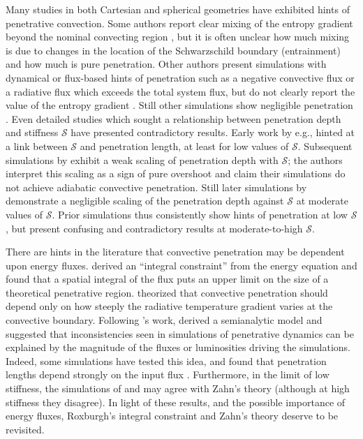 \documentclass[twocolumn]{aastex631}
\newcommand{\mS}{\ensuremath{\mathcal{S}}}
\begin{document}
Many studies in both Cartesian and spherical geometries have exhibited hints of penetrative convection.
Some authors report clear mixing of the entropy gradient beyond the nominal convecting region \citep{hurlburt_etal_1994, saikia_etal_2000, brummell_etal_2002, rogers_glatzmaier_2005, rogers_etal_2006, kitiashvili_etal_2016}, but it is often unclear how much mixing is due to changes in the location of the Schwarzschild boundary (entrainment) and how much is pure penetration.
Other authors present simulations with dynamical or flux-based hints of penetration such as a negative convective flux or a radiative flux which exceeds the total system flux, but do not clearly report the value of the entropy gradient \citep{hurlburt_etal_1986, singh_etal_1995, browning_etal_2004, brun_etal_2017, pratt_etal_2017}.
Still other simulations show negligible penetration \citep[e.g.,][]{higl_etal_2021}.
Even detailed studies which sought a relationship between penetration depth and stiffness $\mS$ have presented contradictory results.
Early work by e.g., \citet{hurlburt_etal_1994, singh_etal_1995} hinted at a link between $\mS$ and penetration length, at least for low values of $\mS$.
Subsequent simulations by \citet{brummell_etal_2002} exhibit a weak scaling of penetration depth with $\mS$; the authors interpret this scaling as a sign of pure overshoot and claim their simulations do not achieve adiabatic convective penetration.
Still later simulations by \citet{rogers_glatzmaier_2005} demonstrate a negligible scaling of the penetration depth against $\mS$ at moderate values of $\mS$.
Prior simulations thus consistently show hints of penetration at low $\mS$ \citep[where results may not be relevant for stars,][]{couston_etal_2017}, but present confusing and contradictory results at moderate-to-high $\mS$.

There are hints in the literature that convective penetration may be dependent upon energy fluxes.
\citet{roxburgh1978, roxburgh1989, roxburgh1992, roxburgh1998} derived an ``integral constraint'' from the energy equation and found that a spatial integral of the flux puts an upper limit on the size of a theoretical penetrative region.
\citet{zahn1991} theorized that convective penetration should depend only on how steeply the radiative temperature gradient varies at the convective boundary.
Following \citet{zahn1991}'s work, \citet{rempel2004} derived a semianalytic model and suggested that inconsistencies seen in simulations of penetrative dynamics can be explained by the magnitude of the fluxes or luminosities driving the simulations.
Indeed, some simulations have tested this idea, and found that penetration lengths depend strongly on the input flux \citep{singh_etal_1998, kapyla_etal_2007, tian_etal_2009, hotta2017, kapyla2019}.
Furthermore, in the limit of low stiffness, the simulations of \citet{hurlburt_etal_1994} and \citet{rogers_glatzmaier_2005} may agree with Zahn's theory (although at high stiffness they disagree).
In light of these results, and the possible importance of energy fluxes, Roxburgh's integral constraint and Zahn's theory deserve to be revisited.
\end{document}
